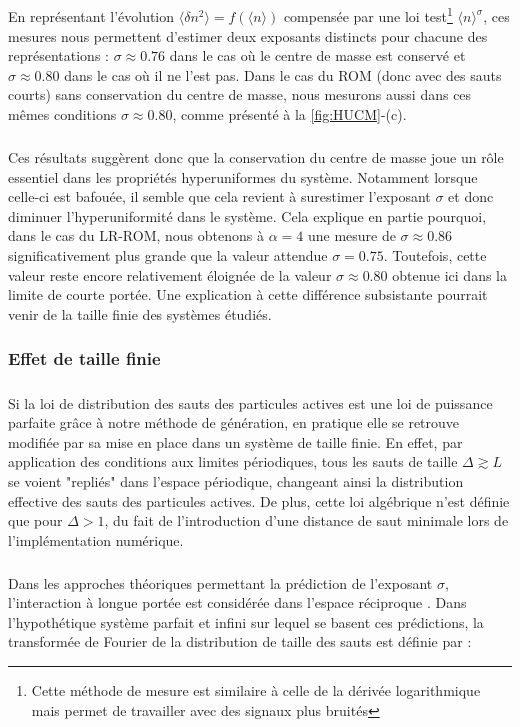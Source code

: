 \subparagraph{}En représentant l'évolution $\langle \delta n^2 \rangle = f(\langle n \rangle)$ compensée par une loi test\footnote{Cette méthode de mesure est similaire à celle de la dérivée logarithmique mais permet de travailler avec des signaux plus bruités} $\langle n \rangle^\sigma$, ces mesures nous permettent d'estimer deux exposants distincts pour chacune des représentations : $\sigma \approx 0.76$ dans le cas où le centre de masse est conservé et $\sigma\approx 0.80$ dans le cas où il ne l'est pas. Dans le cas du ROM (donc avec des sauts courts) sans conservation du centre de masse, nous mesurons aussi dans ces mêmes conditions $\sigma\approx 0.80$, comme présenté à la \autoref{fig:HUCM}-(c).

\subparagraph{}Ces résultats suggèrent donc que la conservation du centre de masse joue un rôle essentiel dans les propriétés hyperuniformes du système. Notamment lorsque celle-ci est bafouée, il semble que cela revient à surestimer l'exposant $\sigma$ et donc diminuer l'hyperuniformité dans le système. Cela explique en partie pourquoi, dans le cas du LR-ROM, nous obtenons à $\alpha = 4$ une mesure de $\sigma\approx 0.86$ significativement plus grande que la valeur attendue $\sigma= 0.75$. Toutefois, cette valeur reste encore relativement éloignée de la valeur $\sigma\approx 0.80$ obtenue ici dans la limite de courte portée. Une explication à cette différence subsistante pourrait venir de la taille finie des systèmes étudiés.

\subsubsection{Effet de taille finie}

\subparagraph{}Si la loi de distribution des sauts des particules actives est une loi de puissance parfaite grâce à notre méthode de génération, en pratique elle se retrouve modifiée par sa mise en place dans un système de taille finie. En effet, par application des conditions aux limites périodiques, tous les sauts de taille $\Delta \gtrsim L$ se voient "repliés" dans l'espace périodique, changeant ainsi la distribution effective des sauts des particules actives. De plus, cette loi algébrique n'est définie que pour $\Delta>1$, du fait de l'introduction d'une distance de saut minimale lors de l'implémentation numérique.

\subparagraph{}Dans les approches théoriques permettant la prédiction de l'exposant $\sigma$, l'interaction à longue portée est considérée dans l'espace réciproque \cite{wiese_longrange}. Dans l'hypothétique système parfait et infini sur lequel se basent ces prédictions, la transformée de Fourier de la distribution de taille des sauts est définie par :

